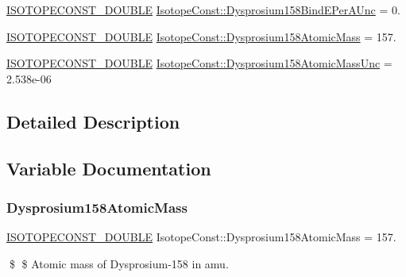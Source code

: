 \begin{DoxyCompactItemize}
\mbox{\hyperlink{group___isotope_const-_macros_ga8f45a7272ce02c0b4c65c44636ed719a}{I\+S\+O\+T\+O\+P\+E\+C\+O\+N\+S\+T\+\_\+\+D\+O\+U\+B\+LE}} \mbox{\hyperlink{group___isotope_const-_dysprosium-_dy158_gafb9c678108774156349e076b46a4d6e8}{Isotope\+Const\+::\+Dysprosium158\+Bind\+E\+Per\+A\+Unc}} = 0.
\item 
\mbox{\hyperlink{group___isotope_const-_macros_ga8f45a7272ce02c0b4c65c44636ed719a}{I\+S\+O\+T\+O\+P\+E\+C\+O\+N\+S\+T\+\_\+\+D\+O\+U\+B\+LE}} \mbox{\hyperlink{group___isotope_const-_dysprosium-_dy158_ga0fdebbe520350dece12920e76da38b93}{Isotope\+Const\+::\+Dysprosium158\+Atomic\+Mass}} = 157.
\item 
\mbox{\hyperlink{group___isotope_const-_macros_ga8f45a7272ce02c0b4c65c44636ed719a}{I\+S\+O\+T\+O\+P\+E\+C\+O\+N\+S\+T\+\_\+\+D\+O\+U\+B\+LE}} \mbox{\hyperlink{group___isotope_const-_dysprosium-_dy158_ga2d72526ce80f8e5b3fee964d5f37b08f}{Isotope\+Const\+::\+Dysprosium158\+Atomic\+Mass\+Unc}} = 2.\+538e-\/06
\end{DoxyCompactItemize}


\subsection{Detailed Description}


\subsection{Variable Documentation}
\mbox{\label{group___isotope_const-_dysprosium-_dy158_ga0fdebbe520350dece12920e76da38b93}} 
\subsubsection{\texorpdfstring{Dysprosium158\+Atomic\+Mass}{Dysprosium158AtomicMass}}
{\footnotesize\ttfamily \mbox{\hyperlink{group___isotope_const-_macros_ga8f45a7272ce02c0b4c65c44636ed719a}{I\+S\+O\+T\+O\+P\+E\+C\+O\+N\+S\+T\+\_\+\+D\+O\+U\+B\+LE}} Isotope\+Const\+::\+Dysprosium158\+Atomic\+Mass = 157.}

\$ \$ Atomic mass of Dysprosium-\/158 in amu. \mbox{\label{group___isotope_const-_dysprosium-_dy158_ga2d72526ce80f8e5b3fee964d5f37b08f}} 

